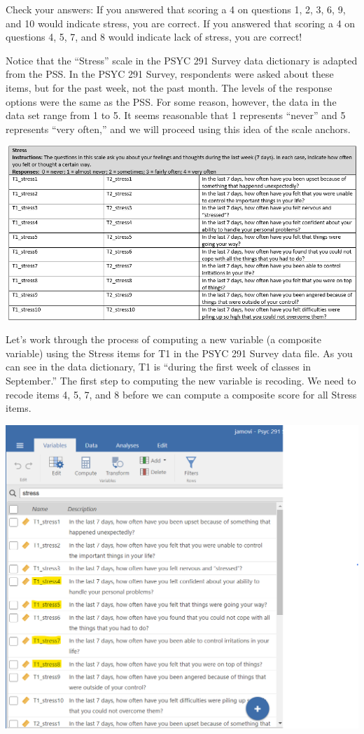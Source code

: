 \documentclass[
]{book}
\begin{document}
Check your answers:
If you answered that scoring a 4 on questions 1, 2, 3, 6, 9, and 10 would indicate stress, you are correct.
If you answered that scoring a 4 on questions 4, 5, 7, and 8 would indicate lack of stress, you are correct!

Notice that the ``Stress'' scale in the PSYC 291 Survey data dictionary is adapted from the PSS. In the PSYC 291 Survey, respondents were asked about these items, but for the past week, not the past month. The levels of the response options were the same as the PSS. For some reason, however, the data in the data set range from 1 to 5. It seems reasonable that 1 represents ``never'' and 5 represents ``very often,'' and we will proceed using this idea of the scale anchors.

\includegraphics{img/StressScaleFromPSYC291Survey.png}

Let's work through the process of computing a new variable (a composite variable) using the Stress items for T1 in the PSYC 291 Survey data file. As you can see in the data dictionary, T1 is ``during the first week of classes in September.'' The first step to computing the new variable is recoding. We need to recode items 4, 5, 7, and 8 before we can compute a composite score for all Stress items.

\includegraphics{img/StressScale_ShowingVariablesToRecode.png}
\end{document}
